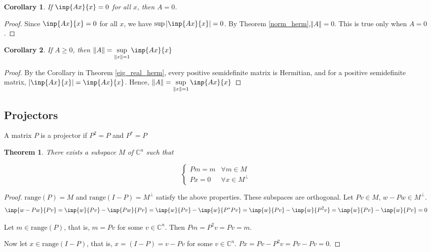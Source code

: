 \documentclass[twoside]{article}
\newcommand*\adj[1]{#1^*}
\newcommand*\norm[1]{\left \Vert #1 \right\Vert}
\newcommand*\abs[1]{\left \vert #1 \right\vert}
\theoremstyle{plain}
\newtheorem{theorem}{Theorem}
\newtheorem*{corollary}{Corollary}
\theoremstyle{definition}
\theoremstyle{remark}
\begin{document}
\begin{corollary} If \(\inp{Ax}{x} = 0\) for all \(x\), then \(A = 0\).\end{corollary}
\begin{proof} Since \(\inp{Ax}{x} = 0\) for all \(x\), we have \(\sup \abs{\inp{Ax}{x}} = 0\). By Theorem \ref{norm_herm},\( \norm{A} = 0 \). This is true only when \(A = 0\).\end{proof}


\begin{corollary} If \(A \ge 0\), then \(\displaystyle \norm{A} = \sup _{\norm{x} = 1} \inp{Ax}{x}\) \end{corollary}
\begin{proof}   By the Corollary in Theorem \ref{eig_real_herm}, every positive semidefinite matrix is Hermitian, and for a positive semidefinite matrix, \(\abs{\inp{Ax}{x}} = \inp{Ax}{x}\). Hence, \(\norm{A} = \displaystyle \sup_{\norm{x} = 1} \inp{Ax}{x}\) \end{proof}





\subsection{Projectors}
A matrix \(P\) is a projector if \(P^2 = P\) and \(\adj{P} = P\)

\begin{theorem} There exists a subspace \(M\) of \(\mathbb{C}^n\) such that 

\[\begin{cases}
Pm = m & \forall m \in M \\
Px = 0 & \forall x \in M^\perp 
\end{cases}\] 
\end{theorem}
\begin{proof}  \(\mathrm{range}(P)= M\) and \(\mathrm{range}(I - P) = M^\perp\) satisfy the above properties. These subspaces are orthogonal. Let \(Pv \in M\), \(w - Pw \in M^\perp\). 
\[\inp{w - Pw}{Pv} = \inp{w}{Pv} - \inp{Pw}{Pv} = \inp{w}{Pv} - \inp{w}{\adj{P}Pv} = \inp{w}{Pv} - \inp{w}{P^2v} = \inp{w}{Pv} - \inp{w}{Pv} = 0\]

Let \(m \in \mathrm{range}(P)\), that is, \(m= Pv\) for some \(v \in \mathbb{C}^n\). Then \(Pm = P^2 v = Pv = m\). 

Now let \(x \in \mathrm{range}(I - P)\), that is, \(x = (I - P) = v - Pv\) for some \(v \in \mathbb{C}^n\). \(Px = Pv - P^2v = Pv - Pv = 0\).
 \end{proof}
\end{document}
